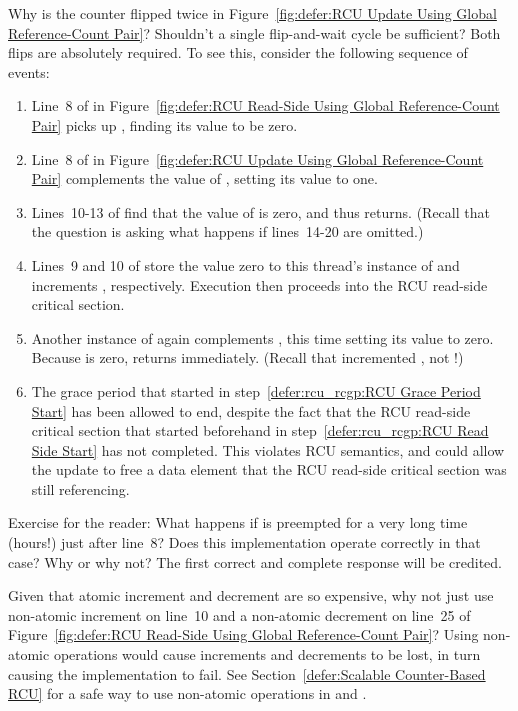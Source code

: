 \QuickQ{}
	Why is the counter flipped twice in
	Figure~\ref{fig:defer:RCU Update Using Global Reference-Count Pair}?
	Shouldn't a single flip-and-wait cycle be sufficient?
\QuickA{}
	Both flips are absolutely required.
	To see this, consider the following sequence of events:
	\begin{enumerate}
	\item	Line~8 of  in
		Figure~\ref{fig:defer:RCU Read-Side Using Global Reference-Count Pair}
		picks up , finding its value to be zero.
	\item	Line~8 of  in
		Figure~\ref{fig:defer:RCU Update Using Global Reference-Count Pair}
		complements the value of , setting its
		value to one.
	\item	Lines~10-13 of  find that the
		value of  is zero, and thus
		returns.
		(Recall that the question is asking what happens if
		lines~14-20 are omitted.)
	\item	Lines~9 and 10 of  store the
		value zero to this thread's instance of 
		and increments , respectively.
		Execution then proceeds into the RCU read-side critical
		section.
		\label{defer:rcu_rcgp:RCU Read Side Start}
	\item	Another instance of  again complements
		, this time setting its value to zero.
		Because  is zero, 
		returns immediately.
		(Recall that  incremented
		, not !)
		\label{defer:rcu_rcgp:RCU Grace Period Start}
	\item	The grace period that started in
		step~\ref{defer:rcu_rcgp:RCU Grace Period Start}
		has been allowed to end, despite
		the fact that the RCU read-side critical section
		that started beforehand in
		step~\ref{defer:rcu_rcgp:RCU Read Side Start}
		has not completed.
		This violates RCU semantics, and could allow the update
		to free a data element that the RCU read-side critical
		section was still referencing.
	\end{enumerate}

	Exercise for the reader: What happens if 
	is preempted for a very long time (hours!) just after
	line~8?
	Does this implementation operate correctly in that case?
	Why or why not?
	The first correct and complete response will be credited.

\QuickQ{}
	Given that atomic increment and decrement are so expensive,
	why not just use non-atomic increment on line~10 and a
	non-atomic decrement on line~25 of
	Figure~\ref{fig:defer:RCU Read-Side Using Global Reference-Count Pair}?
\QuickA{}
	Using non-atomic operations would cause increments and decrements
	to be lost, in turn causing the implementation to fail.
	See Section~\ref{defer:Scalable Counter-Based RCU}
	for a safe way to use non-atomic operations in
	 and .

